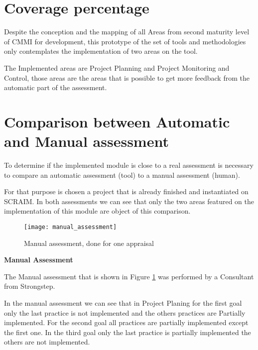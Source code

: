 \section{Coverage percentage} \label{sec:coverage}



Despite the conception and the mapping of all Areas from second maturity level of CMMI for development, this prototype of the set of tools and methodologies only contemplates the implementation of two areas on the tool.

The Implemented areas are Project Planning and Project Monitoring and Control, those areas are the areas that is possible to get more feedback from the automatic part of the assessment. 
 
\section{Comparison between Automatic and Manual assessment} \label{sec:automatic}

To determine if the implemented module is close to a real assessment is necessary to compare an automatic assessment (tool) to a manual assessment (human).

For that purpose is chosen a project that is already finished and instantiated on SCRAIM.
In both assessments we can see that only the two areas featured on the implementation of this module are object of this comparison.

\begin{figure}[!htb]
	\begin{center}
		\leavevmode
		\texttt{[image: manual\_assessment]}
		\caption{Manual assessment, done for one appraisal}
		\label{fig:manual_assessment}
	\end{center}
\end{figure}

\textbf{Manual Assessment}

The Manual assessment that is shown in Figure \ref{fig:manual_assessment} was performed by a Consultant from Strongstep.

In the manual assessment we can see that in Project Planing for the first goal only the last practice is not implemented and the others practices are Partially implemented. For the second goal all practices are partially implemented except the first one.
In the third goal only the last practice is partially implemented the others are not implemented.

